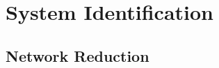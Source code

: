 \part{System Identification}
\label{system_identification}

\chapter{Network Reduction}
\label{network_reduction}























	